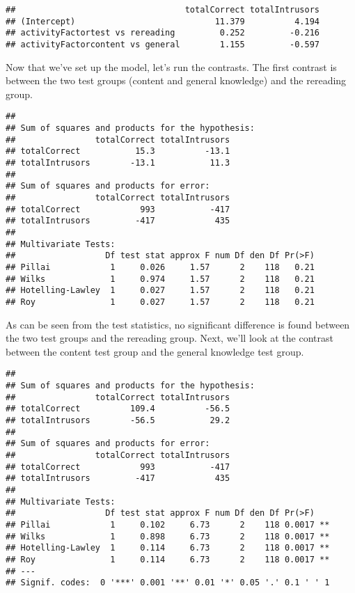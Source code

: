 \documentclass[11pt,]{article}
\begin{document}
\begin{verbatim}
##                                  totalCorrect totalIntrusors
## (Intercept)                            11.379          4.194
## activityFactortest vs rereading         0.252         -0.216
## activityFactorcontent vs general        1.155         -0.597
\end{verbatim}

Now that we've set up the model, let's run the contrasts. The first
contrast is between the two test groups (content and general knowledge)
and the rereading group.

\begin{verbatim}
## 
## Sum of squares and products for the hypothesis:
##                totalCorrect totalIntrusors
## totalCorrect           15.3          -13.1
## totalIntrusors        -13.1           11.3
## 
## Sum of squares and products for error:
##                totalCorrect totalIntrusors
## totalCorrect            993           -417
## totalIntrusors         -417            435
## 
## Multivariate Tests: 
##                  Df test stat approx F num Df den Df Pr(>F)
## Pillai            1     0.026     1.57      2    118   0.21
## Wilks             1     0.974     1.57      2    118   0.21
## Hotelling-Lawley  1     0.027     1.57      2    118   0.21
## Roy               1     0.027     1.57      2    118   0.21
\end{verbatim}

As can be seen from the test statistics, no significant difference is
found between the two test groups and the rereading group. Next, we'll
look at the contrast between the content test group and the general
knowledge test group.

\begin{verbatim}
## 
## Sum of squares and products for the hypothesis:
##                totalCorrect totalIntrusors
## totalCorrect          109.4          -56.5
## totalIntrusors        -56.5           29.2
## 
## Sum of squares and products for error:
##                totalCorrect totalIntrusors
## totalCorrect            993           -417
## totalIntrusors         -417            435
## 
## Multivariate Tests: 
##                  Df test stat approx F num Df den Df Pr(>F)   
## Pillai            1     0.102     6.73      2    118 0.0017 **
## Wilks             1     0.898     6.73      2    118 0.0017 **
## Hotelling-Lawley  1     0.114     6.73      2    118 0.0017 **
## Roy               1     0.114     6.73      2    118 0.0017 **
## ---
## Signif. codes:  0 '***' 0.001 '**' 0.01 '*' 0.05 '.' 0.1 ' ' 1
\end{verbatim}
\end{document}
